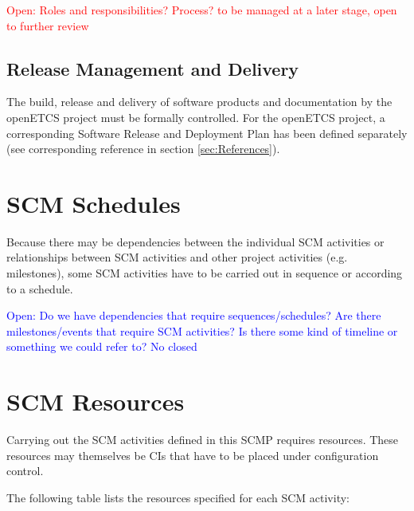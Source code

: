 \documentclass{template/openetcs_report}
\begin{document}
\textcolor{red}{Open: Roles and responsibilities? Process? to be managed at a later stage, open to further review}


\subsection{Release Management and Delivery} %
\label{sec:Release Management and Delivery}

The build, release and delivery of software products and documentation by the openETCS project must be formally controlled. For the openETCS project, a corresponding Software Release and Deployment Plan has been defined separately (see corresponding reference in section \ref{sec:References}).

\newpage


\section{SCM Schedules} %
\label{sec:SCM Schedules}

Because there may be dependencies between the individual SCM activities or relationships between SCM activities and other project activities (e.g. milestones), some SCM activities  have to be carried out in sequence or according to a schedule.

\textcolor{blue}{Open: Do we have dependencies that require sequences/schedules? Are there milestones/events that require SCM activities? Is there some kind of timeline or something we could refer to? No closed}

\newpage


\section{SCM Resources} %
\label{sec:SCM Resources}

Carrying out the SCM activities defined in this SCMP requires resources. These resources may themselves be CIs that have to be placed under configuration control.

The following table lists the resources specified for each SCM activity:
\end{document}
